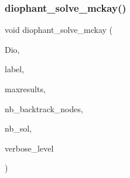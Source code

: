 \subsubsection{\texorpdfstring{diophant\+\_\+solve\+\_\+mckay()}{diophant\_solve\_mckay()}}
{\footnotesize\ttfamily void diophant\+\_\+solve\+\_\+mckay (\begin{DoxyParamCaption}\item[{\mbox{\hyperlink{classdiophant}{diophant}} $\ast$}]{Dio,  }\item[{const \mbox{\hyperlink{galois_8h_ab6cc7b4aeb6ea31aba2b3fbfc83ff5e6}{B\+Y\+TE}} $\ast$}]{label,  }\item[{\mbox{\hyperlink{galois_8h_a09fddde158a3a20bd2dcadb609de11dc}{I\+NT}}}]{maxresults,  }\item[{\mbox{\hyperlink{galois_8h_a09fddde158a3a20bd2dcadb609de11dc}{I\+NT}} \&}]{nb\+\_\+backtrack\+\_\+nodes,  }\item[{\mbox{\hyperlink{galois_8h_a09fddde158a3a20bd2dcadb609de11dc}{I\+NT}} \&}]{nb\+\_\+sol,  }\item[{\mbox{\hyperlink{galois_8h_a09fddde158a3a20bd2dcadb609de11dc}{I\+NT}}}]{verbose\+\_\+level }\end{DoxyParamCaption})}

\mbox{\label{incidence__global_8_c_ade26681e912db350f0d405ccdb340519}} 
